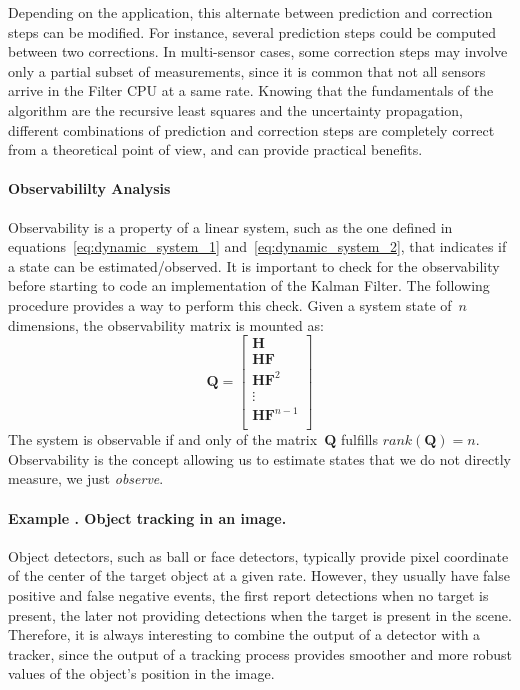 Depending on the application, this alternate between prediction and correction steps can be modified. For instance, several prediction steps could be computed between two corrections. In multi-sensor cases, some correction steps may involve only a partial subset of measurements, since it is common that not all sensors arrive in the Filter CPU at a same rate. Knowing that the fundamentals of the algorithm are the recursive least squares and the uncertainty propagation, different combinations of prediction and correction steps are completely correct from a theoretical point of view, and can provide practical benefits.

\paragraph{Observabililty Analysis} Observability is a property of a linear system, such as the one defined in equations~\ref{eq:dynamic_system_1} and~\ref{eq:dynamic_system_2}, that indicates if a state can be estimated/observed. It is important to check for the observability before starting to code an implementation of the Kalman Filter. The following procedure provides a way to perform this check. Given a system state of~$n$ dimensions, the observability matrix is mounted as:
\begin{equation}
\mathbf{Q} = 
\left[
 \begin{array}{c}
  \mathbf{H}\\
  \mathbf{H}\mathbf{F}\\
  \mathbf{H}\mathbf{F}^2\\
  \vdots\\
  \mathbf{H}\mathbf{F}^{n-1}\\
 \end{array}
\right]
\end{equation}
The system is observable if and only of the matrix~$\mathbf{Q}$ fulfills $rank(\mathbf{Q})=n$. Observability is the concept allowing us to estimate states that we do not directly measure, we just \textit{observe}.

\paragraph{Example \theexamplecounter. Object tracking in an image.}
Object detectors, such as ball or face detectors, typically provide pixel coordinate of the center of the target object at a given rate. However, they usually have false positive and false negative events, the first report detections when no target is present, the later not providing detections when the target is present in the scene. Therefore, it is always interesting to combine the output of a detector with a tracker, since the output of a tracking process provides smoother and more robust values of the object's position in the image.

